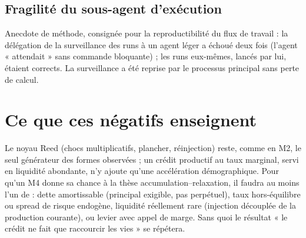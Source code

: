 \documentclass[11pt,a4paper]{article}
\begin{document}
\subsection{Fragilité du sous-agent d'exécution}
Anecdote de méthode, consignée pour la reproductibilité du flux de travail :
la délégation de la surveillance des runs à un agent léger a échoué deux
fois (l'agent « attendait » sans commande bloquante) ; les runs eux-mêmes,
lancés par lui, étaient corrects. La surveillance a été reprise par le
processus principal sans perte de calcul.

\section{Ce que ces négatifs enseignent}
Le noyau Reed (chocs multiplicatifs, plancher, réinjection) reste, comme en
M2, le seul générateur des formes observées ; un crédit productif au taux
marginal, servi en liquidité abondante, n'y ajoute qu'une accélération
démographique. Pour qu'un M4 donne sa chance à la thèse
accumulation--relaxation, il faudra au moins l'un de : dette amortissable
(principal exigible, pas perpétuel), taux hors-équilibre ou spread de
risque endogène, liquidité réellement rare (injection découplée de la
production courante), ou levier avec appel de marge. Sans quoi le résultat
« le crédit ne fait que raccourcir les vies » se répétera.
\end{document}
